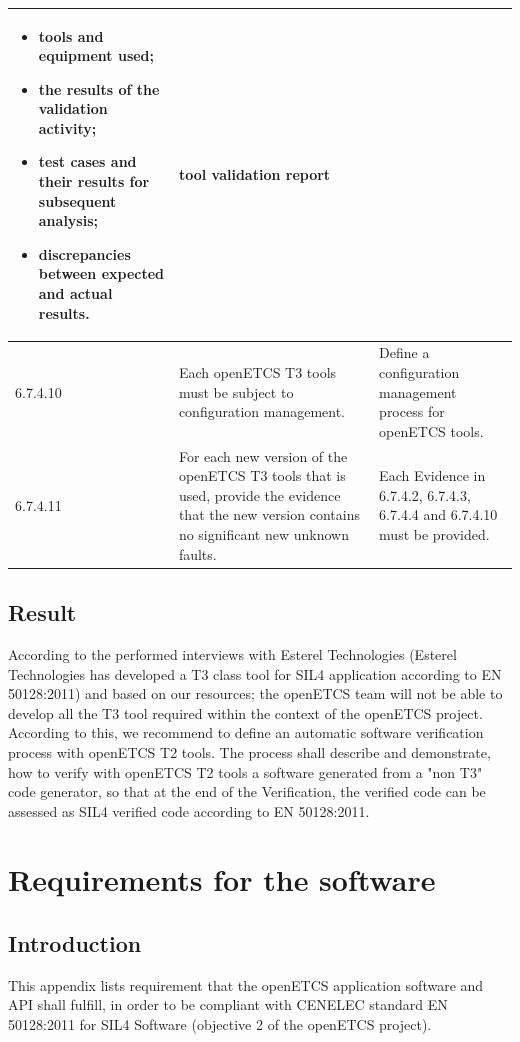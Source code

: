 \documentclass{template/openetcs_report}
\begin{document}
{\begin{longtable}{|p{2cm}|p{9cm}|p{3cm}|}
\begin{itemize}
  \item tools and equipment used;
  \item the results of the validation activity;
  \item test cases and their results for subsequent analysis;
  \item discrepancies between expected and actual results.
\end{itemize}
& tool validation report\\ 
\hline
6.7.4.10 & Each openETCS T3 tools must be subject to configuration management. & Define a configuration management process for openETCS tools.\\ 
\hline
6.7.4.11 & For each new version of the openETCS T3 tools that is used, provide the evidence that the new version contains no significant new unknown faults. & Each Evidence in 6.7.4.2, 6.7.4.3, 6.7.4.4 and 6.7.4.10 must be provided.\\ 
\hline
\end{longtable}}


\newpage
    
\section{Result}
According to the performed interviews with Esterel Technologies (Esterel Technologies has developed a T3 class tool for SIL4 application according to EN 50128:2011) and based on our resources; the openETCS team will not be able to develop all the T3 tool required within the context of the openETCS project. According to this, we recommend to define an automatic software verification process with openETCS T2 tools. The process shall describe and demonstrate, how to verify with openETCS T2 tools a software generated from a "non T3" code generator, so that at the end of the Verification, the verified code can be assessed as SIL4 verified code according to EN 50128:2011.



\chapter{Requirements for the software}
\label{annexB}
\section{Introduction}
This appendix lists requirement that the openETCS application software and API shall fulfill, in order to be compliant with CENELEC standard EN 50128:2011 for SIL4 Software (objective 2 of the openETCS project).
\end{document}
